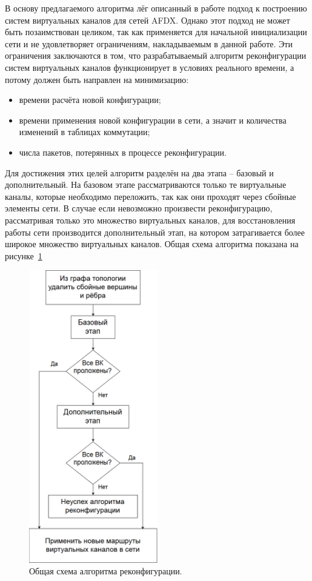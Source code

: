 \documentclass[12pt, a4paper]{article}
\begin{document}
В основу предлагаемого алгоритма лёг описанный в работе \cite{vdovinalg} подход к построению систем виртуальных каналов для сетей AFDX. Однако этот подход не может быть позаимствован целиком, так как применяется для начальной инициализации сети и не удовлетворяет ограничениям, накладываемым в данной работе. Эти ограничения заключаются в том, что разрабатываемый алгоритм реконфигурации систем виртуальных каналов функционирует в условиях реального времени, а потому должен быть направлен на минимизацию:
\begin{itemize}
	\item времени расчёта новой конфигурации;
	\item времени применения новой конфигурации в сети, а значит и количества изменений в таблицах коммутации;
	\item числа пакетов, потерянных в процессе реконфигурации.
\end{itemize} 

Для достижения этих целей алгоритм разделён на два этапа -- базовый и дополнительный. На базовом этапе рассматриваются только те виртуальные каналы, которые необходимо переложить, так как они проходят через сбойные элементы сети. В случае если невозможно произвести реконфигурацию, рассматривая только это множество виртуальных каналов, для восстановления работы сети производится дополнительный этап, на котором затрагивается более широкое множество виртуальных каналов. Общая схема алгоритма показана на рисунке~\ref{pic:algorithm}

\begin{figure}[h!]
	\centering
	\includegraphics[width=0.50\textwidth]{img/alg.png}
	\caption{Общая схема алгоритма реконфигурации.}
	\label{pic:algorithm}
\end{figure}
\end{document}
